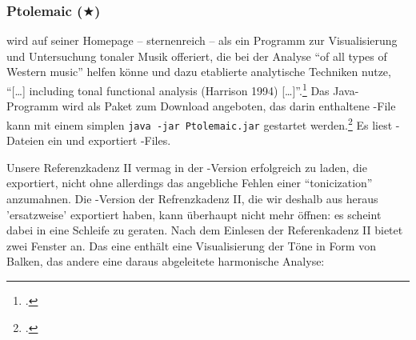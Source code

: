 %
%
%




\subsubsection{Ptolemaic ($\bigstar$)}

\label{Ptolemaic} wird auf seiner Homepage -- sternenreich -- als
ein Programm zur Visualisierung und Untersuchung tonaler Musik offeriert, die
bei der Analyse \enquote{of all types of Western music} helfen könne und dazu
etablierte analytische Techniken nutze, \enquote{[\ldots] including tonal
functional analysis (Harrison 1994) [\ldots]}.\footcite[vgl.][\nopage
wp]{Ptolemaic2016a} Das Java-Programm wird als Paket zum Download angeboten, das
darin enthaltene -File kann mit einem simplen \texttt{java -jar
Ptolemaic.jar} gestartet werden.\footcite[vgl.][\nopage wp]{Ptolemaic2016b} Es
liest -Dateien ein und exportiert -Files.

Unsere Referenzkadenz II vermag  in der -Version
erfolgreich zu laden, die  exportiert, nicht ohne allerdings das
angebliche Fehlen einer \enquote{tonicization} anzumahnen. Die
-Version der Refrenzkadenz II, die wir deshalb aus 
heraus 'ersatzweise' exportiert haben, kann  überhaupt nicht mehr
öffnen: es scheint dabei in eine Schleife zu geraten. Nach dem Einlesen der
Referenkadenz II bietet  zwei Fenster an. Das eine enthält eine
Visualisierung der Töne in Form von Balken, das andere eine daraus abgeleitete
harmonische Analyse:

